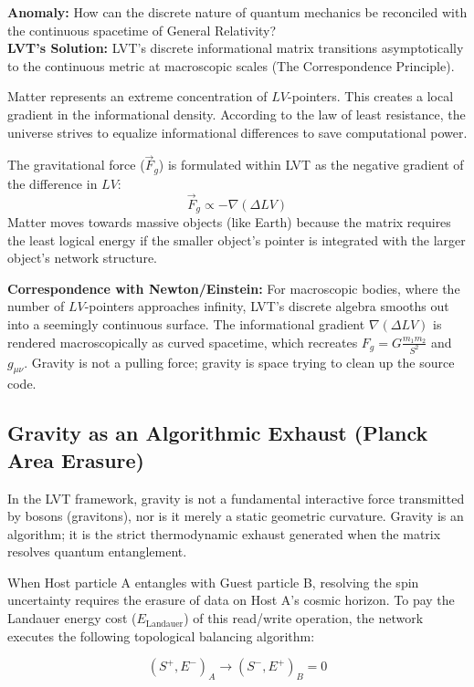 \documentclass[12pt,a4paper]{article}
\begin{document}
\textbf{Anomaly:} How can the discrete nature of quantum mechanics be reconciled with the continuous spacetime of General Relativity? \\
\textbf{LVT's Solution:} LVT's discrete informational matrix transitions asymptotically to the continuous metric at macroscopic scales (The Correspondence Principle).

Matter represents an extreme concentration of $LV$-pointers. This creates a local gradient in the informational density. According to the law of least resistance, the universe strives to equalize informational differences to save computational power.

The gravitational force ($\vec{F}_g$) is formulated within LVT as the negative gradient of the difference in $LV$:
\begin{equation}
\vec{F}_g \propto -\nabla (\Delta LV)
\end{equation}
Matter moves towards massive objects (like Earth) because the matrix requires the least logical energy if the smaller object's pointer is integrated with the larger object's network structure. 

\textbf{Correspondence with Newton/Einstein:}
For macroscopic bodies, where the number of $LV$-pointers approaches infinity, LVT's discrete algebra smooths out into a seemingly continuous surface. The informational gradient $\nabla (\Delta LV)$ is rendered macroscopically as curved spacetime, which recreates $F_g = G \frac{m_1 m_2}{S^2}$ and $g_{\mu\nu}$. Gravity is not a pulling force; gravity is space trying to clean up the source code.

\subsection{Gravity as an Algorithmic Exhaust (Planck Area Erasure)}

In the LVT framework, gravity is not a fundamental interactive force transmitted by bosons (gravitons), nor is it merely a static geometric curvature. Gravity is an algorithm; it is the strict thermodynamic exhaust generated when the matrix resolves quantum entanglement.

When Host particle A entangles with Guest particle B, resolving the spin uncertainty requires the erasure of data on Host A's cosmic horizon. To pay the Landauer energy cost ($E_{\mathrm{Landauer}}$) of this read/write operation, the network executes the following topological balancing algorithm:

\begin{equation}
(S^{+}, E^{-})_A \rightarrow (S^{-}, E^{+})_B = 0
\end{equation}
\end{document}
